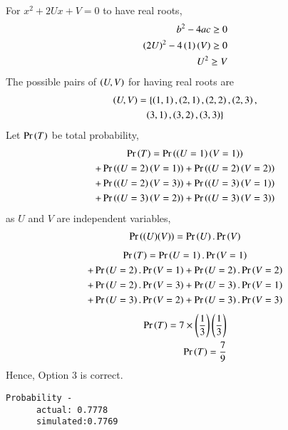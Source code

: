 \documentclass[journal,12pt,twocolumn]{IEEEtran}
\begin{document}
For $x^2+2U x+V=0$ to have real roots,
\begin{align}
    b^2-4ac\geq0\\
    \left(2U\right)^2-4\left(1\right)\left(V\right)\geq0\\
    U^2\geq V
\end{align}
The possible pairs of $\left(U,V\right)$ for having real roots are
\begin{multline}
    \left(U,V\right)=\{\left(1,1\right), \left(2,1\right), \left(2,2\right), \left(2,3\right),\\ \left(3,1\right), \left(3,2\right), \left(3,3\right)\}
\end{multline}
Let $\Pr\left(T\right)$ be total probability,
\begin{multline}
    \Pr\left(T\right)=\Pr\left(\left(U=1\right)\left(V=1\right)\right) \\+ \Pr\left(\left(U=2\right)\left(V=1\right)\right) + \Pr\left(\left(U=2\right)\left(V=2\right)\right) \\+ \Pr\left(\left(U=2\right)\left(V=3\right)\right) + \Pr\left(\left(U=3\right)\left(V=1\right)\right) \\+ \Pr\left(\left(U=3\right)\left(V=2\right)\right) + \Pr\left(\left(U=3\right)\left(V=3\right)\right)
\end{multline}
as $U$ and $V$ are independent variables,
\begin{align}
    \Pr\left((U)(V)\right)=\Pr\left(U\right).\Pr\left(V\right)
\end{align}
\begin{multline}
    \Pr\left(T\right)=\Pr\left(U=1\right).\Pr\left(V=1\right) \\+ \Pr\left(U=2\right).\Pr\left(V=1\right) + \Pr\left(U=2\right).\Pr\left(V=2\right) \\+ \Pr\left(U=2\right).\Pr\left(V=3\right) + \Pr\left(U=3\right).\Pr\left(V=1\right) \\+ \Pr\left(U=3\right).\Pr\left(V=2\right) + \Pr\left(U=3\right).\Pr\left(V=3\right)
\end{multline}
\begin{align}
    \Pr\left(T\right)=7\times\left(\frac{1}{3}\right)\left(\frac{1}{3}\right)\\
    \Pr\left(T\right)=\frac{7}{9}
\end{align}
Hence, Option 3 is correct.
\begin{lstlisting}
Probability -
      actual: 0.7778
      simulated:0.7769
\end{lstlisting}
\end{document}
